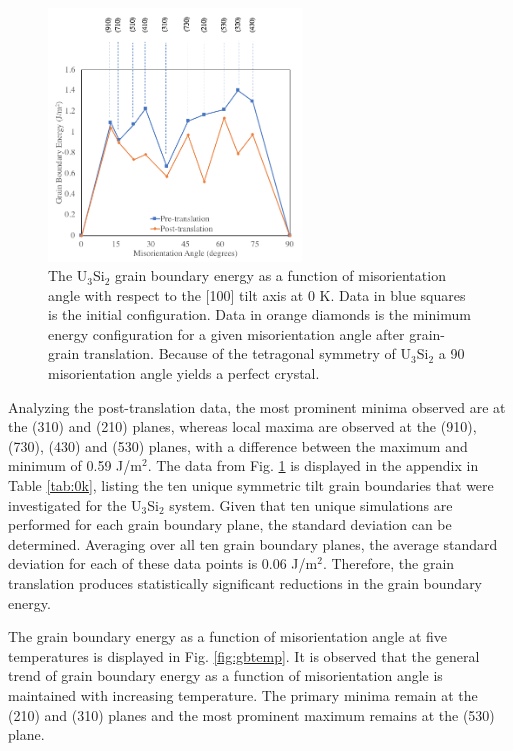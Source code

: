 \documentclass[review]{elsarticle}
\begin{document}
\begin{figure}[h]
 \centering
 \includegraphics[width=0.6\textwidth]{translation0k.png} 
 \caption{The U$_{3}$Si$_{2}$ grain boundary energy as a function of misorientation angle with respect to the [100] tilt axis at 0 K. Data in blue squares is the initial configuration. Data in orange diamonds is the minimum energy configuration for a given misorientation angle after grain-grain translation. Because of the tetragonal symmetry of U$_{3}$Si$_{2}$ a 90{\degree} misorientation angle yields a perfect crystal. }
 \label{fig:translate}
\end{figure}

\FloatBarrier

Analyzing the post-translation data, the most prominent minima observed are at the (310) and (210) planes, whereas local maxima are observed at the (910), (730), (430) and (530) planes, with a difference between the maximum and minimum of 0.59 J/m$^{2}$.  The data from Fig. \ref{fig:translate} is displayed in the appendix in Table \ref{tab:0k}, listing the ten unique symmetric tilt grain boundaries that were investigated for the U$_{3}$Si$_{2}$ system. Given that ten unique simulations are performed for each grain boundary plane, the standard deviation can be determined. Averaging over all ten grain boundary planes, the average standard deviation for each of these data points is 0.06 J/m$^{2}$. Therefore, the grain translation produces statistically significant reductions in the grain boundary energy. 


\FloatBarrier

The grain boundary energy as a function of misorientation angle at five temperatures is displayed in Fig. \ref{fig:gbtemp}. It is observed that the general trend of grain boundary energy as a function of misorientation angle is maintained with increasing temperature. The primary minima remain at the (210) and (310) planes and the most prominent maximum remains at the (530) plane. 
\end{document}
